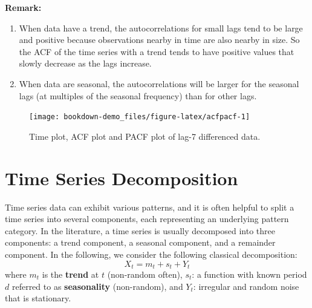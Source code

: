 \documentclass[]{book}
\newenvironment{Shaded}{\begin{snugshade}}{\end{snugshade}}
\newcommand{\KeywordTok}[1]{\textcolor[rgb]{0.13,0.29,0.53}{\textbf{#1}}}
\newcommand{\DataTypeTok}[1]{\textcolor[rgb]{0.13,0.29,0.53}{#1}}
\newcommand{\DecValTok}[1]{\textcolor[rgb]{0.00,0.00,0.81}{#1}}
\newcommand{\StringTok}[1]{\textcolor[rgb]{0.31,0.60,0.02}{#1}}
\newcommand{\OperatorTok}[1]{\textcolor[rgb]{0.81,0.36,0.00}{\textbf{#1}}}
\newcommand{\NormalTok}[1]{#1}
\begin{document}
\textbf{Remark:}

\begin{enumerate}
\def\labelenumi{\arabic{enumi}.}
\item
  When data have a trend, the autocorrelations for small lags tend to be
  large and positive because observations nearby in time are also nearby
  in size. So the ACF of the time series with a trend tends to have
  positive values that slowly decrease as the lags increase.
\item
  When data are seasonal, the autocorrelations will be larger for the
  seasonal lags (at multiples of the seasonal frequency) than for other
  lags.
\end{enumerate}

\begin{Shaded}
\end{Shaded}

\begin{figure}

{\centering \texttt{[image: bookdown-demo\_files/figure-latex/acfpacf-1]} 

}

\caption{Time plot, ACF plot and PACF plot of lag-7 differenced data.}\label{fig:acfpacf}
\end{figure}

\section{Time Series Decomposition}\label{time-series-decomposition}

Time series data can exhibit various patterns, and it is often helpful
to split a time series into several components, each representing an
underlying pattern category. In the literature, a time series is usually
decomposed into three components: a trend component, a seasonal
component, and a remainder component. In the following, we consider the
following classical decomposition: \[
    X_t=m_t+s_t+Y_t
    \] where \(m_t\) is the \textbf{trend} at \(t\) (non-random often),
\(s_t\): a function with known period \(d\) referred to as
\textbf{seasonality} (non-random), and \(Y_t\): irregular and random
noise that is stationary.
\end{document}
